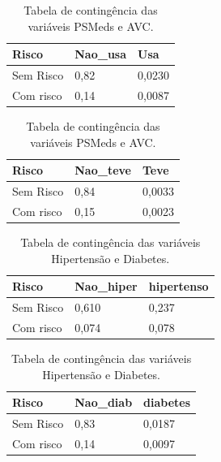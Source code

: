\documentclass[
  12pt,
]{article}
\begin{document}
\begin{table}[H]
\caption{\label{tab:meds}Tabela de contingência das variáveis PSMeds e AVC.}

\centering
\fontsize{10}{12}\selectfont
\begin{tabular}[t]{lll}
\toprule
Risco & Nao\_usa & Usa\\
\midrule
Sem Risco & 0,82 & 0,0230\\
Com risco & 0,14 & 0,0087\\
\bottomrule
\end{tabular}
\centering
\begin{tabular}[t]{lll}
\toprule
Risco & Nao\_teve & Teve\\
\midrule
Sem Risco & 0,84 & 0,0033\\
Com risco & 0,15 & 0,0023\\
\bottomrule
\end{tabular}
\end{table}

\begin{table}[H]
\caption{\label{tab:hiper}Tabela de contingência das variáveis Hipertensão e Diabetes.}

\centering
\fontsize{10}{12}\selectfont
\begin{tabular}[t]{lll}
\toprule
Risco & Nao\_hiper & hipertenso\\
\midrule
Sem Risco & 0,610 & 0,237\\
Com risco & 0,074 & 0,078\\
\bottomrule
\end{tabular}
\centering
\begin{tabular}[t]{lll}
\toprule
Risco & Nao\_diab & diabetes\\
\midrule
Sem Risco & 0,83 & 0,0187\\
Com risco & 0,14 & 0,0097\\
\bottomrule
\end{tabular}
\end{table}
\end{document}
